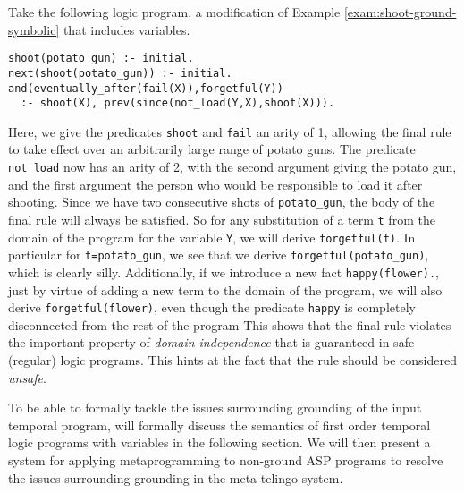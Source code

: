 \begin{example}\label{exam:shoot-nonground-unsafe}
  Take the following logic program, a modification of Example
  \ref{exam:shoot-ground-symbolic} that includes variables.
\begin{lstlisting}[language=clingo,numbers=none]
shoot(potato_gun) :- initial.
next(shoot(potato_gun)) :- initial.
and(eventually_after(fail(X)),forgetful(Y)) 
  :- shoot(X), prev(since(not_load(Y,X),shoot(X))).
\end{lstlisting}
\end{example}

Here, we give the predicates \verb|shoot| and \verb|fail| an arity of
1, allowing the final rule to take effect over an arbitrarily large
range of potato guns. The predicate \verb|not_load| now has an arity
of 2, with the second argument giving the potato gun, and the first
argument the person who would be responsible to load it after
shooting. Since we have two consecutive shots of \verb|potato_gun|,
the body of the final rule will always be satisfied. So for any
substitution of a term \verb|t| from the domain of the program for the
variable \verb|Y|, we will derive \verb|forgetful(t)|. In particular
for \verb|t=potato_gun|, we see that we derive
\verb|forgetful(potato_gun)|, which is clearly silly. Additionally, if
we introduce a new fact \verb|happy(flower).|, just by virtue of
adding a new term to the domain of the program, we will also derive
\verb|forgetful(flower)|, even though the predicate \verb|happy| is
completely disconnected from the rest of the program This shows that
the final rule violates the important property of \textit{domain
  independence} that is guaranteed in safe (regular) logic
programs. This hints at the fact that the rule should be considered
\textit{unsafe}.

To be able to formally tackle the issues surrounding grounding of the
input temporal program, will formally discuss the semantics of first
order temporal logic programs with variables in the following
section. We will then present a system for applying metaprogramming to
non-ground ASP programs to resolve the issues surrounding grounding in
the meta-telingo system.
